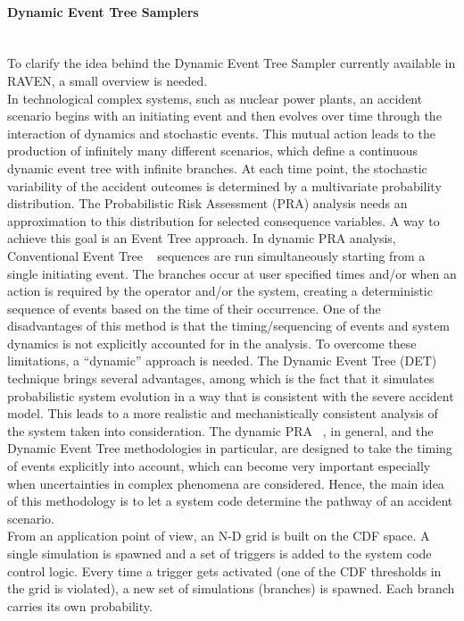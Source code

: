 \paragraph{Dynamic Event Tree Samplers}~\\
To clarify the idea behind the Dynamic Event Tree Sampler currently available in RAVEN, a small overview is needed. 
\\In technological complex systems, such as nuclear power plants, an accident scenario begins with an initiating event and then evolves over time through the interaction of dynamics and stochastic events. This mutual action leads to the production of infinitely many different scenarios, which define a continuous dynamic event tree with infinite branches. At each time point, the stochastic variability of the accident outcomes is determined by a multivariate probability distribution. The Probabilistic Risk Assessment (PRA) analysis needs an approximation to this distribution for selected consequence variables. A way to achieve this goal is an Event Tree approach. In dynamic PRA analysis, Conventional Event Tree ~\cite{} sequences are run simultaneously starting from a single initiating event. The branches occur at user specified times and/or when an action is required by the operator and/or the system, creating a deterministic sequence of events based on the time of their occurrence. One of the disadvantages of this method is that the timing/sequencing of events and system dynamics is not explicitly accounted for in the analysis. To overcome these limitations, a “dynamic” approach is needed. The Dynamic Event Tree (DET) ~\cite{} technique brings several advantages, among which is the fact that it simulates probabilistic system evolution in a way that is consistent with the severe accident model. This leads to a more realistic and mechanistically consistent analysis of the system taken into consideration. The dynamic PRA ~\cite{}, in general, and the Dynamic Event Tree methodologies in particular, are designed to take the timing of events explicitly into account, which can become very important especially when uncertainties in complex phenomena are considered. Hence, the main idea of this methodology is to let a system code determine the pathway of an accident scenario.
\\From an application point of view, an N-D grid is built on the CDF space. A single simulation is spawned and a set of triggers is added to the system code control logic. Every time a trigger gets activated (one of the CDF thresholds in the grid is violated), a new set of simulations (branches) is spawned. Each branch carries its own probability. 
